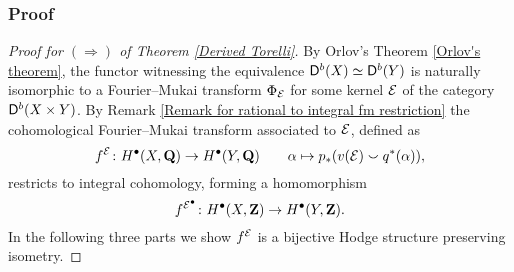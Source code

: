 \subsubsection*{Proof}
\label{proof of ->}

\begin{proof}[Proof for $(\Rightarrow)$ of Theorem \ref{Derived Torelli}]
    By Orlov's Theorem \ref{Orlov's theorem}, the functor witnessing the equi\-valence $\mathsf{D}^b(X) \simeq \mathsf{D}^b(Y)$ is naturally isomorphic to a Fourier--Mukai transform $\Phi_{\mathcal E}$ for some kernel $\mathcal E$ of the category $\mathsf{D}^b(X \times Y)$. 
    By Remark \ref{Remark for rational to integral fm restriction} the cohomological Fourier--Mukai transform associated to $\mathcal E$, defined as
     \[
        f^{\mathcal E} \colon H^\bullet(X, \mathbf Q) \to H^\bullet(Y, \mathbf Q) \qquad \alpha \mapsto p_*(v(\mathcal E) \smallsmile q^*(\alpha)),
    \]
    restricts to integral cohomology, forming a homomorphism
    \[
        f^{\mathcal E^\bullet} \colon H^\bullet(X, \mathbf Z) \to H^\bullet(Y, \mathbf Z).
    \]
    In the following three parts we show $f^{\mathcal E}$ is a bijective Hodge structure preserving isometry.
    

\end{proof}
